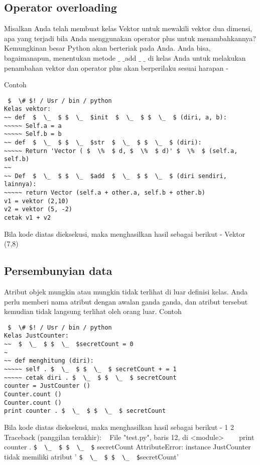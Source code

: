 \subsection{Operator overloading}
Misalkan Anda telah membuat kelas Vektor untuk mewakili vektor dua dimensi, apa yang terjadi bila Anda menggunakan operator plus untuk menambahkannya? Kemungkinan besar Python akan berteriak pada Anda. Anda bisa, bagaimanapun, menentukan metode  $  \_  $ $  \_  $add $  \_  $ $  \_  $ di kelas Anda untuk melakukan penambahan vektor dan operator plus akan berperilaku sesuai harapan - \par
Contoh

\begin{verbatim}
 $  \# $! / Usr / bin / python
Kelas vektor:
~~ def  $  \_  $ $  \_  $init  $  \_  $ $  \_  $ (diri, a, b):
~~~~~ Self.a = a
~~~~~ Self.b = b
~~ def  $  \_  $ $  \_  $str  $  \_  $ $  \_  $ (diri):
~~~~~ Return 'Vector ( $  \%  $ d, $  \%  $ d)' $  \%  $ (self.a, self.b)
~~
~~ Def  $  \_  $ $  \_  $add  $  \_  $ $  \_  $ (diri sendiri, lainnya):
~~~~~ return Vector (self.a + other.a, self.b + other.b)
v1 = vektor (2,10)
v2 = vektor (5, -2)
cetak v1 + v2
\end{verbatim}

Bila kode diatas dieksekusi, maka menghasilkan hasil sebagai berikut -
Vektor (7,8)

\subsection{Persembunyian data}
Atribut objek mungkin atau mungkin tidak terlihat di luar definisi kelas. Anda perlu memberi nama atribut dengan awalan ganda ganda, dan atribut tersebut kemudian tidak langsung terlihat oleh orang luar.
Contoh

\begin {verbatim}
 $  \# $! / Usr / bin / python
Kelas JustCounter:
~~  $  \_  $ $  \_  $secretCount = 0
~
~~ def menghitung (diri):
~~~~~ self . $  \_  $ $  \_  $ secretCount + = 1
~~~~~ cetak diri . $  \_  $ $  \_  $ secretCount
counter = JustCounter ()
Counter.count ()
Counter.count ()
print counter . $  \_  $ $  \_  $ secretCount
\end{verbatim}

Bila kode diatas dieksekusi, maka menghasilkan hasil sebagai berikut -
1
2
Traceback (panggilan terakhir):
~ File "test.py", baris 12, di <module>
~~~ print counter . \verb|$  \_  $ $  \_  $| secretCount
AttributeError: instance JustCounter tidak memiliki atribut ' \verb|$  \_  $ $  \_  $|secretCount'

